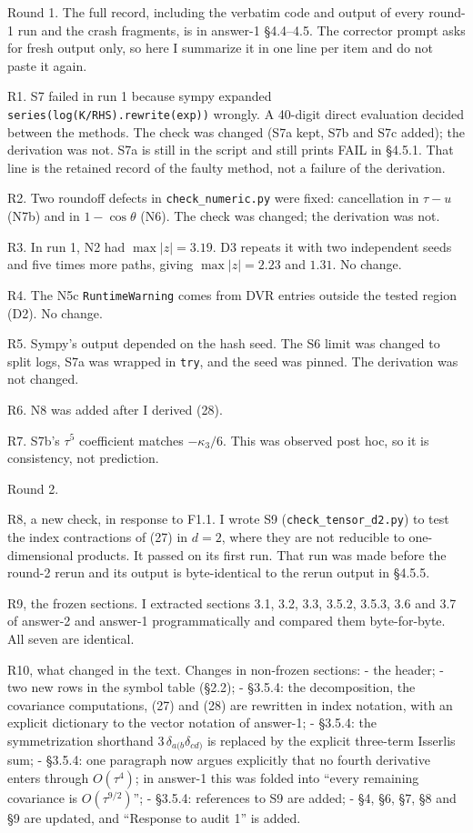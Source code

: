 \documentclass[11pt,a4paper]{article}
\begin{document}
Round 1. The full record, including the verbatim code and output of every round-1 run and the crash fragments, is in answer-1 §4.4--4.5. The corrector prompt asks for fresh output only, so here I summarize it in one line per item and do not paste it again.

R1. S7 failed in run 1 because sympy expanded \texttt{series(log(K/RHS).rewrite(exp))} wrongly. A 40-digit direct evaluation decided between the methods. The check was changed (S7a kept, S7b and S7c added); the derivation was not. S7a is still in the script and still prints FAIL in §4.5.1. That line is the retained record of the faulty method, not a failure of the derivation.

R2. Two roundoff defects in \texttt{check\_numeric.py} were fixed: cancellation in \(\tau-u\) (N7b) and in \(1-\cos\theta\) (N6). The check was changed; the derivation was not.

R3. In run 1, N2 had \(\max|z|=3.19\). D3 repeats it with two independent seeds and five times more paths, giving \(\max|z|=2.23\) and \(1.31\). No change.

R4. The N5c \texttt{RuntimeWarning} comes from DVR entries outside the tested region (D2). No change.

R5. Sympy's output depended on the hash seed. The S6 limit was changed to split logs, S7a was wrapped in \texttt{try}, and the seed was pinned. The derivation was not changed.

R6. N8 was added after I derived (28).

R7. S7b's \(\tau^5\) coefficient matches \(-\kappa_3/6\). This was observed post hoc, so it is consistency, not prediction.

Round 2.

R8, a new check, in response to F1.1. I wrote S9 (\texttt{check\_tensor\_d2.py}) to test the index contractions of (27) in \(d=2\), where they are not reducible to one-dimensional products. It passed on its first run. That run was made before the round-2 rerun and its output is byte-identical to the rerun output in §4.5.5.

R9, the frozen sections. I extracted sections 3.1, 3.2, 3.3, 3.5.2, 3.5.3, 3.6 and 3.7 of answer-2 and answer-1 programmatically and compared them byte-for-byte. All seven are identical.

R10, what changed in the text. Changes in non-frozen sections:
- the header;
- two new rows in the symbol table (§2.2);
- §3.5.4: the decomposition, the covariance computations, (27) and (28) are rewritten in index notation, with an explicit dictionary to the vector notation of answer-1;
- §3.5.4: the symmetrization shorthand \(3\,\delta_{a(b}\delta_{cd)}\) is replaced by the explicit three-term Isserlis sum;
- §3.5.4: one paragraph now argues explicitly that no fourth derivative enters through \(O(\tau^4)\); in answer-1 this was folded into ``every remaining covariance is \(O(\tau^{9/2})\)'';
- §3.5.4: references to S9 are added;
- §4, §6, §7, §8 and §9 are updated, and ``Response to audit 1'' is added.
\end{document}
